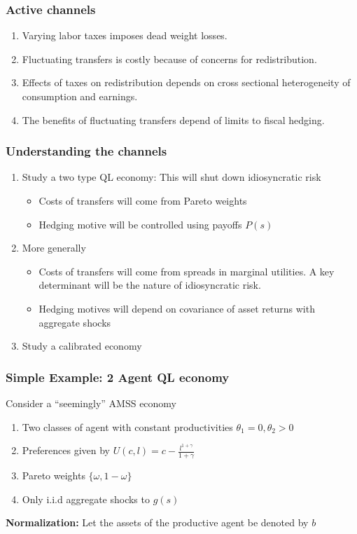 \documentclass{beamer}
\begin{document}
\begin{frame}
 \frametitle{Active channels}
  \begin{enumerate}
\item Varying labor taxes imposes dead weight losses.


\item Fluctuating transfers is costly because of concerns for redistribution. 

\item Effects of taxes on redistribution depends on cross sectional heterogeneity of consumption and earnings.

\item The benefits of fluctuating transfers depend of limits to fiscal hedging.

\end{enumerate}

 \end{frame}
\begin{frame}
 \frametitle{Understanding the channels}
 \begin{enumerate}
  
  \item Study a two type QL economy: This will shut down idiosyncratic risk  
  \begin{itemize}
   
   \item Costs of transfers will come from Pareto weights
   \item Hedging motive will be controlled using payoffs $P(s)$
  \end{itemize}

  \item More generally 
  \begin{itemize}
   \item Costs of transfers will come from spreads in marginal utilities. A key determinant will be the nature of idiosyncratic risk.
   \item Hedging motives will depend on covariance of asset returns with aggregate shocks
   \end{itemize}
\item Study a calibrated economy  

 \end{enumerate}

 
\end{frame}


\begin{frame}
 \frametitle{Simple Example: 2 Agent QL economy}
 Consider a ``seemingly'' AMSS economy
 \begin{enumerate}
  \item Two classes of agent with constant productivities $\theta_1=0,\theta_2>0$
  \item Preferences given by $U(c,l)=c-\frac{l^{1+\gamma}}{1+\gamma}$
  \item Pareto weights $\{\omega,1-\omega\}$
  \item Only i.i.d aggregate shocks to $g(s)$
 \end{enumerate}
 
 \textbf{Normalization:} Let the assets of the productive agent be denoted by $b$
\end{frame}
\end{document}
